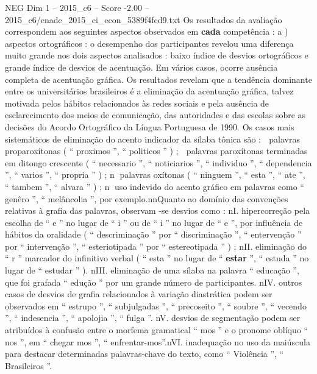 \begin{textsample}{NEG Dim 1 – 2015\_c6 – Score -2.00 – 2015\_c6/enade\_2015\_ci\_econ\_5389f4fcd9.txt}
Os resultados da avaliação correspondem aos seguintes aspectos observados em \textbf{cada} competência : a ) aspectos ortográficos : o desempenho dos participantes revelou uma diferença muito grande nos dois aspectos analisados : baixo índice de desvios ortográficos e grande índice de desvios de acentuação.
Em vários casos, ocorre ausência completa de acentuação gráfica.
Os resultados revelam que a tendência dominante entre os universitários brasileiros é a eliminação da acentuação gráfica, talvez motivada pelos hábitos relacionados às redes sociais e pela ausência de esclarecimento dos meios de comunicação, das autoridades e das escolas sobre as decisões do Acordo Ortográfico da Língua Portuguesa de 1990.
Os casos mais sistemáticos de eliminação do acento indicador da sílaba tônica são :  palavras proparoxítonas ( “ proximos ”, “ politicos ” ) ;  palavras paroxítonas terminadas em ditongo crescente ( “ necessario ”, “ noticiarios ”, “ individuo ”, “ dependencia ”, “ varios ”, “ propria ” ) ; n palavras oxítonas ( “ ninguem ”, “ esta ”, “ ate ”, “ tambem ”, “ alvara ” ) ; n uso indevido do acento gráfico em palavras como “ genêro ”, “ melâncolia ”, por exemplo.nnQuanto ao domínio das convenções relativas à grafia das palavras, observam -se desvios como : nI. hipercorreção pela escolha de “ e ” no lugar de “ i ” ou de “ i ” no lugar de “ e ”, por influência de hábitos da oralidade ( “ descriminação ” por “ discriminação ”, “ entervenção ” por “ intervenção ”, “ esteriotipada ” por “ estereotipada ” ) ; nII. eliminação do “ r ” marcador do infinitivo verbal ( “ esta ” no lugar de “ \textbf{estar} ”, “ estuda ” no lugar de “ estudar ” ). nIII. eliminação de uma sílaba na palavra “ educação ”, que foi grafada “ edução ” por um grande número de participantes. nIV. outros casos de desvios de grafia relacionados à variação diastrática podem ser observados em “ estrupo ”, “ subjulgadas ”, “ precoseito ”, “ soubre ”, “ vecendo ”, “ indesencia ”, “ apolojia ”, “ fulga ”. nV. desvios de segmentação podem ser atribuídos à confusão entre o morfema gramatical “ mos ” e o pronome oblíquo “ nos ”, em “ chegar mos ”, “ enfrentar-mos”.nVI. inadequação no uso da maiúscula para destacar determinadas palavras-chave do texto, como “ Violência ”, “ Brasileiros ”.

\end{textsample}
